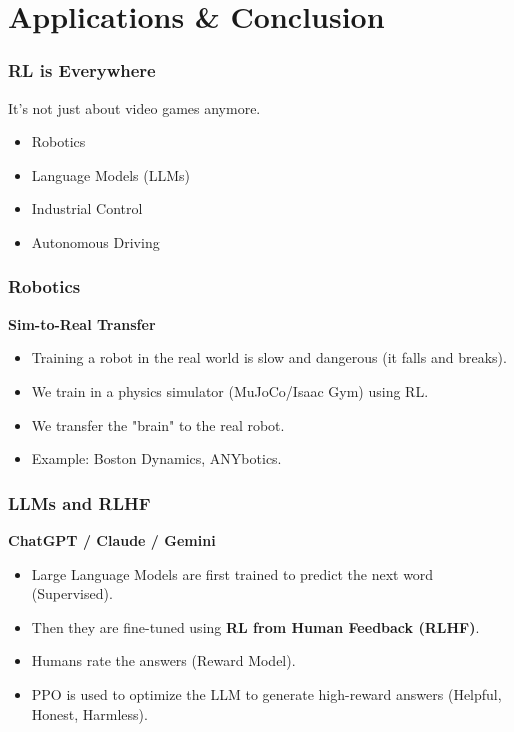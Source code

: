 \documentclass[aspectratio=169]{beamer}
\begin{document}
\section{Applications \& Conclusion}

\begin{frame}
    \frametitle{RL is Everywhere}
    It's not just about video games anymore.
    \begin{itemize}
        \item Robotics
        \item Language Models (LLMs)
        \item Industrial Control
        \item Autonomous Driving
    \end{itemize}
\end{frame}

\begin{frame}
    \frametitle{Robotics}
    \textbf{Sim-to-Real Transfer}
    \begin{itemize}
        \item Training a robot in the real world is slow and dangerous (it falls and breaks).
        \item We train in a physics simulator (MuJoCo/Isaac Gym) using RL.
        \item We transfer the "brain" to the real robot.
        \item Example: Boston Dynamics, ANYbotics.
    \end{itemize}
\end{frame}

\begin{frame}
    \frametitle{LLMs and RLHF}
    \textbf{ChatGPT / Claude / Gemini}
    \begin{itemize}
        \item Large Language Models are first trained to predict the next word (Supervised).
        \item Then they are fine-tuned using \textbf{RL from Human Feedback (RLHF)}.
        \item Humans rate the answers (Reward Model).
        \item PPO is used to optimize the LLM to generate high-reward answers (Helpful, Honest, Harmless).
    \end{itemize}
\end{frame}
\end{document}
